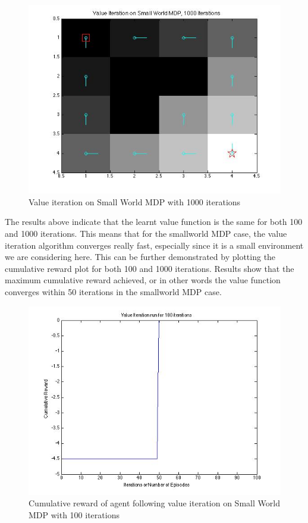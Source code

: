 \documentclass{article}\usepackage[]{graphicx}\usepackage[]{color}
\theoremstyle{plain}
\begin{document}
\begin{figure}[h!]
  \includegraphics[scale=0.5]{Value1000.jpg}
  \caption{Value iteration on Small World MDP with 1000 iterations}
  \label{figure2}
\end{figure}





\noindent
The results above indicate that the learnt value function is the same for both 100 and 1000 iterations. This means that for the smallworld MDP case, the value iteration algorithm converges really fast, especially since it is a small environment we are considering here. This can be further demonstrated by plotting the cumulative reward plot for both 100 and 1000 iterations. Results show that the maximum cumulative reward achieved, or in other words the value function converges within 50 iterations in the smallworld MDP case.\\


\begin{figure}[h!]
  \includegraphics[scale=0.5]{value100_CumRwd.jpg}
  \caption{Cumulative reward of agent following value iteration on Small World MDP with 100 iterations}
  \label{figure3}
\end{figure}
\end{document}
